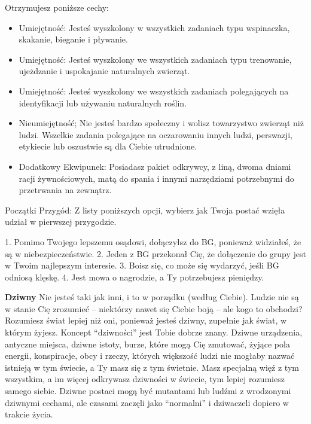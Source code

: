 Otrzymujesz poniższe cechy:
\begin{itemize}
 \item Umiejętność: Jesteś wyszkolony w wszystkich zadaniach typu wspinaczka, skakanie, bieganie i pływanie.
\item Umiejętność: Jesteś wyszkolony we wszystkich zadaniach typu trenowanie, ujeżdzanie i uspokajanie naturalnych zwierząt.
\item Umiejętność: Jesteś wyszkolony we wszystkich zadaniach polegających na identyfikacji lub używaniu naturalnych roślin.
\item Nieumiejętność; Nie jesteś bardzo społeczny i wolisz towarzystwo zwierząt niż ludzi. Wszelkie zadania polegające na oczarowaniu innych ludzi, perswazji, etykiecie lub oszustwie są dla Ciebie utrudnione.
\item Dodatkowy Ekwipunek: Posiadasz pakiet odkrywcy, z liną, dwoma dniami racji żywnościowych, matą do spania i innymi narzędziami potrzebnymi do przetrwania na zewnątrz.
\end{itemize}    
    
Początki Przygód: Z listy poniższych opcji, wybierz jak Twoja postać wzięła udział w pierwszej przygodzie.

1. Pomimo Twojego lepszemu osądowi, dołączyłsz do BG, ponieważ widziałeś, że są w niebezpieczeństwie.
2. Jeden z BG przekonał Cię, że dołączenie do grupy jest w Twoim najlepszym interesie.
3. Boisz się, co może się wydarzyć, jeśli BG odniosą klęskę.
4. Jest mowa o nagrodzie, a Ty potrzebujesz pieniędzy.

\textbf{Dziwny}
Nie jesteś taki jak inni, i to w porządku (według Ciebie). Ludzie nie są w stanie Cię zrozumieć – niektórzy nawet się Ciebie boją – ale kogo to obchodzi? Rozumiesz świat lepiej niż oni, ponieważ jesteś dziwny, zupełnie jak świat, w którym żyjesz. Koncept “dziwności” jest Tobie dobrze znany. Dziwne urządzenia, antyczne miejsca, dziwne istoty, burze, które mogą Cię zmutować, żyjące pola energii, konspiracje, obcy i rzeczy, których większość ludzi nie mogłaby nazwać istnieją w tym świecie, a Ty masz się z tym świetnie. Masz specjalną więź z tym wszystkim, a im więcej odkrywasz dziwności w świecie, tym lepiej rozumiesz samego siebie. Dziwne postaci mogą być mutantami lub ludźmi z wrodzonymi dziwnymi cechami, ale czasami zaczęli jako “normalni” i dziwaczeli dopiero w trakcie życia.

